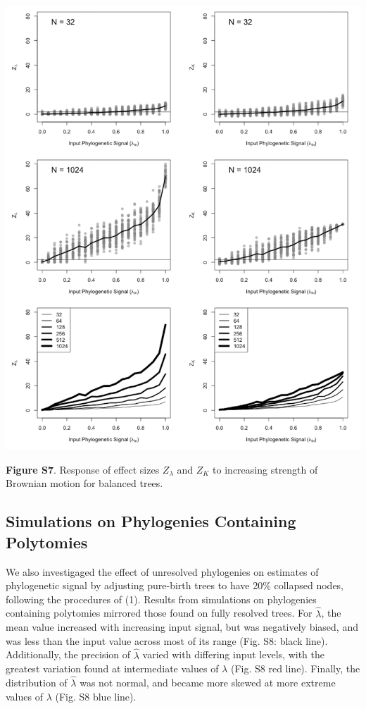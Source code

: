 \documentclass[
]{article}
\begin{document}
\includegraphics[width=0.95\linewidth]{fig.S7}

\textbf{Figure S7}. Response of effect sizes \(Z_{\lambda}\) and \(Z_K\)
to increasing strength of Brownian motion for balanced trees.

\newpage

\hypertarget{simulations-on-phylogenies-containing-polytomies}{%
\subsection{Simulations on Phylogenies Containing
Polytomies}\label{simulations-on-phylogenies-containing-polytomies}}

We also investigaged the effect of unresolved phylogenies on estimates
of phylogenetic signal by adjusting pure-birth trees to have 20\%
collapsed nodes, following the procedures of (1). Results from
simulations on phylogenies containing polytomies mirrored those found on
fully resolved trees. For \(\hat{\lambda}\), the mean value increased
with increasing input signal, but was negatively biased, and was less
than the input value across most of its range (Fig. S8: black line).
Additionally, the precision of \(\hat{\lambda}\) varied with differing
input levels, with the greatest variation found at intermediate values
of \(\lambda\) (Fig. S8 red line). Finally, the distribution of
\(\hat{\lambda}\) was not normal, and became more skewed at more extreme
values of \(\lambda\) (Fig. S8 blue line). \hfill\break
\end{document}

